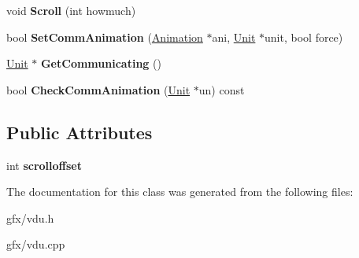 \begin{DoxyCompactItemize}
\item 
void {\bfseries Scroll} (int howmuch)\hypertarget{classVDU_af66a07f86e74f0a5c4cd86a5682842a6}{}\label{classVDU_af66a07f86e74f0a5c4cd86a5682842a6}

\item 
bool {\bfseries Set\+Comm\+Animation} (\hyperlink{classAnimation}{Animation} $\ast$ani, \hyperlink{classUnit}{Unit} $\ast$unit, bool force)\hypertarget{classVDU_a23239667f51d805c7287b889734a0095}{}\label{classVDU_a23239667f51d805c7287b889734a0095}

\item 
\hyperlink{classUnit}{Unit} $\ast$ {\bfseries Get\+Communicating} ()\hypertarget{classVDU_a6798a2c4acf0a1d9272424d40632f2b2}{}\label{classVDU_a6798a2c4acf0a1d9272424d40632f2b2}

\item 
bool {\bfseries Check\+Comm\+Animation} (\hyperlink{classUnit}{Unit} $\ast$un) const \hypertarget{classVDU_a6fd92036179da62e7caa259a2c1751cf}{}\label{classVDU_a6fd92036179da62e7caa259a2c1751cf}

\end{DoxyCompactItemize}
\subsection*{Public Attributes}
\begin{DoxyCompactItemize}
\item 
int {\bfseries scrolloffset}\hypertarget{classVDU_ae6ab123402157526e29ce293fe8d0538}{}\label{classVDU_ae6ab123402157526e29ce293fe8d0538}

\end{DoxyCompactItemize}


The documentation for this class was generated from the following files\+:\begin{DoxyCompactItemize}
\item 
gfx/vdu.\+h\item 
gfx/vdu.\+cpp\end{DoxyCompactItemize}
